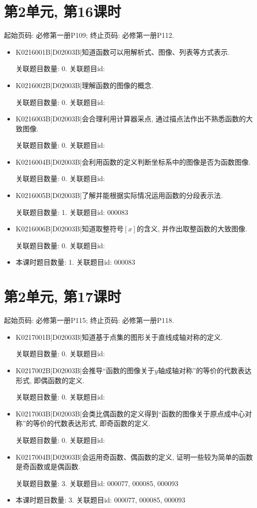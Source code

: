 \section*{第2单元, 第16课时}
起始页码: 必修第一册P109; 终止页码: 必修第一册P112.
\begin{itemize}
\item K0216001B|D02003B|知道函数可以用解析式、图像、列表等方式表示.

关联题目数量: 0. 关联题目id: 

\item K0216002B|D02003B|理解函数的图像的概念.

关联题目数量: 0. 关联题目id: 

\item K0216003B|D02003B|会合理利用计算器采点, 通过描点法作出不熟悉函数的大致图像.

关联题目数量: 0. 关联题目id: 

\item K0216004B|D02003B|会利用函数的定义判断坐标系中的图像是否为函数图像.

关联题目数量: 0. 关联题目id: 

\item K0216005B|D02003B|了解并能根据实际情况运用函数的分段表示法.

关联题目数量: 1. 关联题目id: 000083

\item K0216006B|D02003B|知道取整符号$[x]$的含义, 并作出取整函数的大致图像.

关联题目数量: 0. 关联题目id: 

\item 本课时题目数量: 1. 关联题目id: 000083

\end{itemize}

\section*{第2单元, 第17课时}
起始页码: 必修第一册P115; 终止页码: 必修第一册P118.
\begin{itemize}
\item K0217001B|D02003B|知道基于点集的图形关于直线成轴对称的定义.

关联题目数量: 0. 关联题目id: 

\item K0217002B|D02003B|会推导``函数的图像关于$y$轴成轴对称''的等价的代数表达形式, 即偶函数的定义.

关联题目数量: 0. 关联题目id: 

\item K0217003B|D02003B|会类比偶函数的定义得到``函数的图像关于原点成中心对称''的等价的代数表达形式, 即奇函数的定义.

关联题目数量: 0. 关联题目id: 

\item K0217004B|D02003B|会运用奇函数、偶函数的定义, 证明一些较为简单的函数是奇函数或是偶函数.

关联题目数量: 3. 关联题目id: 000077, 000085, 000093

\item 本课时题目数量: 3. 关联题目id: 000077, 000085, 000093

\end{itemize}

